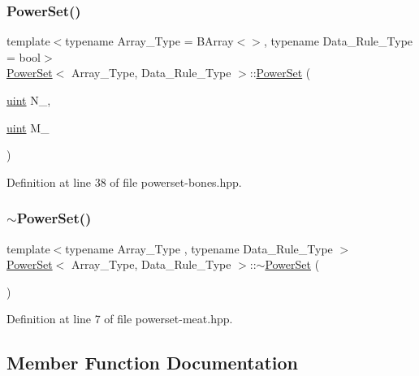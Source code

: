 \subsubsection{\texorpdfstring{Power\+Set()}{PowerSet()}\hspace{0.1cm}{\footnotesize\ttfamily [2/2]}}
{\footnotesize\ttfamily template$<$typename Array\+\_\+\+Type  = B\+Array$<$$>$, typename Data\+\_\+\+Rule\+\_\+\+Type  = bool$>$ \\
\hyperlink{class_power_set}{Power\+Set}$<$ Array\+\_\+\+Type, Data\+\_\+\+Rule\+\_\+\+Type $>$\+::\hyperlink{class_power_set}{Power\+Set} (\begin{DoxyParamCaption}\item[{\hyperlink{typedefs_8hpp_a91ad9478d81a7aaf2593e8d9c3d06a14}{uint}}]{N\+\_\+,  }\item[{\hyperlink{typedefs_8hpp_a91ad9478d81a7aaf2593e8d9c3d06a14}{uint}}]{M\+\_\+ }\end{DoxyParamCaption})\hspace{0.3cm}{\ttfamily [inline]}}



Definition at line 38 of file powerset-\/bones.\+hpp.

\mbox{\label{class_power_set_a89a176c9517e81a066adffad3c46aba5}} 
\subsubsection{\texorpdfstring{$\sim$\+Power\+Set()}{~PowerSet()}}
{\footnotesize\ttfamily template$<$typename Array\+\_\+\+Type , typename Data\+\_\+\+Rule\+\_\+\+Type $>$ \\
\hyperlink{class_power_set}{Power\+Set}$<$ Array\+\_\+\+Type, Data\+\_\+\+Rule\+\_\+\+Type $>$\+::$\sim$\hyperlink{class_power_set}{Power\+Set} (\begin{DoxyParamCaption}{ }\end{DoxyParamCaption})\hspace{0.3cm}{\ttfamily [inline]}}



Definition at line 7 of file powerset-\/meat.\+hpp.



\subsection{Member Function Documentation}
\mbox{\label{class_power_set_a00ee318a40da91bcf0bff79bf71454ab}} 
